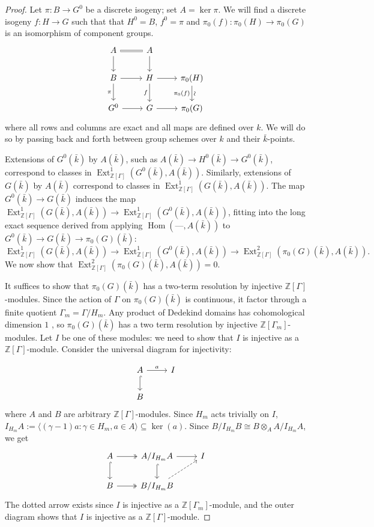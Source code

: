 \documentclass[11pt]{amsart}
\theoremstyle{plain}
\theoremstyle{definition}
\theoremstyle{remark}
\newcommand{\ZZ}{{\mathbb{Z}}}
\newcommand{\bFq}{\bar{k}}
\newcommand{\Fq}{k}
\DeclareMathOperator{\Hom}{Hom}
\DeclareMathOperator{\Ext}{Ext}
\begin{document}
\begin{proof}
Let $\pi: B \to G^0$ be a discrete isogeny; set $A = \ker \pi$.
  We will find a discrete isogeny $f: H\to G$
  such that that $H^0 = B$, $f^0 =\pi$ and
  $\pi_0(f) : \pi_0(H)\to \pi_0(G)$ is an isomorphism of component
  groups.
  \begin{equation}\label{extension-diagram}
  \begin{tikzcd}
  A \arrow[equal]{r} \dar & A \dar \\
  B \rar \dar[swap]{\pi} & H \rar \dar[swap]{f} & \pi_0(H) \arrow{d}[below,rotate=90]{\sim}[swap]{\pi_0(f)} \\
  G^0 \rar & G \rar & \pi_0(G)
  \end{tikzcd}
  \end{equation}
  where all rows and columns are exact and all maps are defined over
  $\Fq$.  We will do so by passing back and forth between group
  schemes over $\Fq$ and their $\bFq$-points.  
  
  Extensions of
  $G^0(\bFq)$ by $A(\bFq)$, such as $A(\bFq) \to H^0(\bFq) \to G^0(\bFq)$,
  correspond to classes in $\Ext^1_{\ZZ[\Gamma]}(G^0(\bFq), A(\bFq))$.
  Similarly, extensions of $G(\bFq)$ by $A(\bFq)$ correspond to
  classes in $\Ext^1_{\ZZ[\Gamma]}(G(\bFq), A(\bFq))$.  The map
  $G^0(\bFq) \to G(\bFq)$ induces the map
  $\Ext^1_{\ZZ[\Gamma]}(G(\bFq), A(\bFq)) \to \Ext^1_{\ZZ[\Gamma]}(G^0(\bFq), A(\bFq))$,
  fitting into the long exact sequence derived from applying
  $\Hom(\mbox{---}, A(\bFq))$ to $G^0(\bFq) \to G(\bFq) \to \pi_0(G)(\bFq)$:
  $$\Ext^1_{\ZZ[\Gamma]}(G(\bFq), A(\bFq)) \to \Ext^1_{\ZZ[\Gamma]}(G^0(\bFq), A(\bFq)) \to \Ext^2_{\ZZ[\Gamma]}(\pi_0(G)(\bFq), A(\bFq)).$$
  We now show that $\Ext^2_{\ZZ[\Gamma]}(\pi_0(G)(\bFq), A(\bFq)) = 0$.

  It suffices to show that $\pi_0(G)(\bFq)$ has a two-term resolution
  by injective $\ZZ[\Gamma]$-modules.  Since the action of $\Gamma$ on
  $\pi_0(G)(\bFq)$ is continuous, it factor through a finite quotient
  $\Gamma_m = \Gamma / H_m$.  Any product of Dedekind domains has
  cohomological dimension $1$ \cite[?]{?}, so $\pi_0(G)(\bFq)$ has a
  two term resolution by injective $\ZZ[\Gamma_m]$-modules.  Let $I$
  be one of these modules: we need to show that $I$ is injective as a
  $\ZZ[\Gamma]$-module.  Consider the universal diagram for injectivity:
  
  \[
  \begin{tikzcd}
  A \rar{a} \arrow[hook]{d} & I \\
  B
  \end{tikzcd}
  \]
  where $A$ and $B$ are arbitrary $\ZZ[\Gamma]$-modules.  Since $H_m$ acts trivially on $I$,
  $I_{H_m}A := \langle (\gamma-1)a : \gamma \in H_m, a \in A \rangle \subseteq \ker(a).$
  Since $B / I_{H_m}B \cong B \otimes_A A / I_{H_m}A$, we get
  \[
  \begin{tikzcd}
  A \arrow[two heads]{r} \arrow[hook]{d} & A/I_{H_m}A \rar \arrow[hook]{d} & I \\
  B \arrow[two heads]{r} & B/I_{H_m}B \arrow[dashed]{ur} & {}
  \end{tikzcd}
  \]
  The dotted arrow exists since $I$ is injective as a
  $\ZZ[\Gamma_m]$-module, and the outer diagram shows that $I$ is
  injective as a $\ZZ[\Gamma]$-module.


\end{proof}
\end{document}
